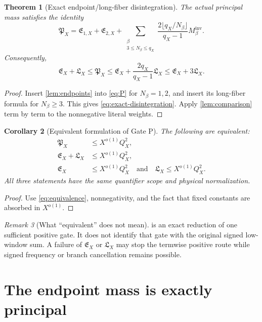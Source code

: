 \documentclass[11pt]{article}
\newtheorem{theorem}{Theorem}[section]
\newtheorem{corollary}[theorem]{Corollary}
\theoremstyle{definition}
\theoremstyle{remark}
\newtheorem{remark}[theorem]{Remark}
\newcommand{\PX}{\mathfrak P_X}
\newcommand{\EX}{\mathfrak E_X}
\newcommand{\LX}{\mathfrak L_X}
\begin{document}
\begin{theorem}[Exact endpoint/long-fiber disintegration]
\label{thm:disintegration}
The actual principal mass satisfies the identity
\begin{equation}
 \PX
 =
 \mathfrak E_{1,X}+\mathfrak E_{2,X}
 +
 \sum_{\substack{\beta\\3\le N_\beta\le q_X}}
 \frac{2\lfloor q_X/N_\beta\rfloor}{q_X-1}
 M_\beta^{\mathrm{inv}}.
\label{eq:exact-disintegration}
\end{equation}
Consequently,
\begin{equation}
 \boxed{
 \EX+\LX
 \le\PX
 \le
 \EX+\frac{2q_X}{q_X-1}\LX
 \le\EX+3\LX.}
\label{eq:equivalence}
\end{equation}
\end{theorem}

\begin{proof}
Insert \cref{lem:endpoints} into \eqref{eq:P} for
\(N_\beta=1,2\), and insert its long-fiber formula for
\(N_\beta\ge3\).  This gives
\eqref{eq:exact-disintegration}.  Apply
\cref{lem:comparison} term by term to the nonnegative literal
weights.
\end{proof}

\begin{corollary}[Equivalent formulation of Gate P]
\label{cor:gate}
The following are equivalent:
\begin{align*}
 \PX&\le X^{o(1)}Q_X^2,\\
 \EX+\LX&\le X^{o(1)}Q_X^2,\\
 \EX&\le X^{o(1)}Q_X^2
 \quad\text{and}\quad
 \LX\le X^{o(1)}Q_X^2.
\end{align*}
All three statements have the same quantifier scope and physical
normalization.
\end{corollary}

\begin{proof}
Use \eqref{eq:equivalence}, nonnegativity, and the fact that fixed
constants are absorbed in \(X^{o(1)}\).
\end{proof}

\begin{remark}[What ``equivalent'' does not mean]
 is an exact reduction of one sufficient positive
gate.  It does not identify that gate with the original signed
low-window sum.  A failure of \(\EX\) or \(\LX\) may stop the
termwise positive route while signed frequency or branch
cancellation remains possible.
\end{remark}

\section{The endpoint mass is exactly principal}
\label{sec:endpoint}
\end{document}
